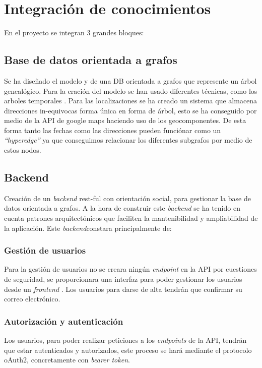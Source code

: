 \documentclass[12pt]{article} %
\begin{document}
\section{Integración de conocimientos}
En el proyecto se integran 3 grandes bloques:

\subsection{Base de datos orientada a grafos}
Se ha diseñado el modelo y de una DB orientada a grafos que represente un árbol genealógico. 
Para la cración del modelo se han usado diferentes técnicas, como los arboles temporales \cite{graphdbbook}. Para las localizaciones se ha creado un sistema que almacena direcciones in-equivocas forma única en forma de árbol, esto se ha conseguido por medio de la API de google maps haciendo uso de los geocomponentes. De esta forma tanto las fechas como las direcciones pueden funciónar como un \textit{``hyperedge''} ya que conseguimos relacionar los diferentes subgrafos por medio de estos nodos.

\subsection{Backend} Creación de un \textit{backend} rest-ful con orientación social, para gestionar la base de datos orientada a grafos. A la hora de construir este \textit{backend} se ha tenido en cuenta patrones arquitectónicos que faciliten la mantenibilidad y ampliabilidad de la aplicación. Este \textit{backend}constara principalmente de:

\subsubsection*{Gestión de usuarios}
Para la gestión de usuarios no se creara ningún \textit{endpoint} en la API por cuestiones de seguridad, se proporcionara una interfaz para poder gestionar los usuarios desde un \textit{frontend }. Los usuarios para darse de alta tendrán que confirmar su correo electrónico.

\subsubsection*{Autorización y autenticación}
Los usuarios, para poder realizar peticiones a los \textit{endpoints} de la API, tendrán que estar autenticados y autorizados, este proceso se hará mediante el protocolo oAuth2, concretamente con \textit{bearer token}.
\end{document}
